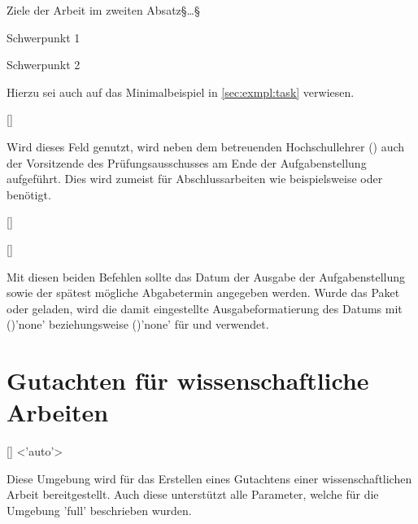 \begin{DeclareEntity}{}
\begin{Example}
\begin{Code}
{  Ziele der Arbeit im zweiten Absatz§\dots§
}{%
  \item Schwerpunkt 1
  \item Schwerpunkt 2
}
\end{Code}
Hierzu sei auch auf das Minimalbeispiel in \autoref{sec:exmpl:task} verwiesen.
%
\end{Example}

\begin{Declaration}
  {[]}
\printdeclarationlist

Wird dieses Feld genutzt, wird neben dem betreuenden Hochschullehrer 
() auch der Vorsitzende des Prüfungsausschusses am Ende der 
Aufgabenstellung aufgeführt. Dies wird zumeist für Abschlussarbeiten wie 
beispielsweise \masterthesisname{} oder \diplomathesisname{} benötigt.
\end{Declaration}

\begin{Declaration}
  {[]}
\begin{Declaration}
  {[]}
\printdeclarationlist

Mit diesen beiden Befehlen sollte das Datum der Ausgabe der Aufgabenstellung 
sowie der spätest mögliche Abgabetermin angegeben werden. Wurde das Paket 
 oder  geladen, wird die damit eingestellte 
Ausgabeformatierung des Datums mit ()'none' 
beziehungsweise ()'none' für  
und   verwendet.
\end{Declaration}
\end{Declaration}


\section{Gutachten für wissenschaftliche Arbeiten}
%
%
\begin{Declaration}
  {[]}
  <'auto'>
\begin{Declaration}
  {}
\begin{Declaration}
  {}
\printdeclarationlist

Diese Umgebung wird für das Erstellen eines Gutachtens einer wissenschaftlichen 
Arbeit bereitgestellt. Auch diese unterstützt alle Parameter, welche für die 
Umgebung 'full' beschrieben wurden.


\end{Declaration}
\end{Declaration}
\end{Declaration}
\end{DeclareEntity}
